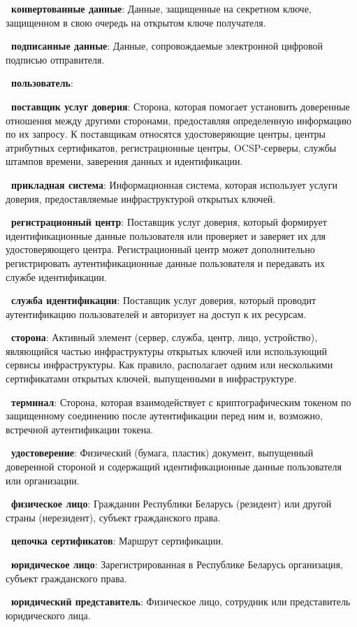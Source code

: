 {\bf \thedefctr~конвертованные данные}:
Данные, защищенные на секретном ключе, 
защищенном в свою очередь на открытом ключе получателя. 

{\bf \thedefctr~подписанные данные}:
Данные, сопровождаемые электронной цифровой подписью отправителя. 

{\bf\thedefctr~пользователь}: 

{\bf\thedefctr~поставщик услуг доверия}:
Сторона, которая помогает установить доверенные отношения между другими 
сторонами, предоставляя определенную информацию по их запросу.
К поставщикам относятся удостоверяющие центры, центры атрибутных 
сертификатов, регистрационные центры, OCSP-серверы, 
службы штампов времени, заверения данных и идентификации.

{\bf\thedefctr~прикладная система}:
Информационная система, которая использует услуги доверия,
предоставляемые инфраструктурой открытых ключей.
%

{\bf\thedefctr~регистрационный центр}: 
Поставщик услуг доверия, который формирует идентификационные данные 
пользователя или проверяет и заверяет их для удостоверяющего центра. 
%
Регистрационный центр может дополнительно регистрировать 
аутентификационные данные пользователя и передавать их службе 
идентификации.

{\bf\thedefctr~служба идентификации}: 
Поставщик услуг доверия, который проводит аутентификацию 
пользователей и авторизует на доступ к их ресурсам.
%

{\bf\thedefctr~сторона}: 
Активный элемент (сервер, служба, центр, лицо, устройство), являющийся 
частью инфраструктуры открытых ключей или использующий сервисы инфраструктуры. 
Как правило, располагает одним или несколькими сертификатами 
открытых ключей, выпущенными в инфраструктуре.

{\bf\thedefctr~терминал}: 
Сторона, которая взаимодействует с криптографическим токеном по 
защищенному соединению после аутентификации перед ним и, возможно, 
встречной аутентификации токена.  

{\bf\thedefctr~удостоверение}: 
Физический (бумага, пластик) документ,
выпущенный доверенной стороной и содержащий идентификационные данные 
пользователя или организации. 

{\bf\thedefctr~физическое лицо}: 
Гражданин Республики Беларусь (резидент) или другой страны (нерезидент),
субъект гражданского права. 

{\bf\thedefctr~цепочка сертификатов}: 
Маршрут сертификации.

{\bf\thedefctr~юридическое лицо}:
Зарегистрированная в Республике Беларусь организация, 
субъект гражданского права.

{\bf\thedefctr~юридический представитель}: 
Физическое лицо, сотрудник или представитель юридического лица.

